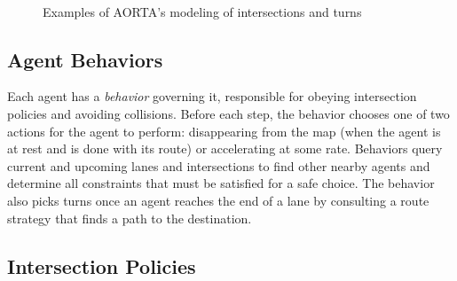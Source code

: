 \documentclass[letterpaper, 10 pt, conference]{ieeeconf}  %
\begin{document}
\begin{figure}[h]
  \centering
  ~ %
  \caption{Examples of AORTA's modeling of intersections and turns}
  \vspace{-15pt}
\end{figure}

\subsection{Agent Behaviors}

Each agent has a \emph{behavior} governing it, responsible for obeying
intersection policies and avoiding collisions. Before each step, the behavior
chooses one of two actions for the agent to perform: disappearing from the map
(when the agent is at rest and is done with its route) or accelerating at some
rate. Behaviors query current and upcoming lanes and intersections to find
other nearby agents and determine all constraints that must be satisfied for a
safe choice. The behavior also picks turns once an agent reaches the end of a
lane by consulting a route strategy that finds a path to the destination.

\subsection{Intersection Policies}
\end{document}
